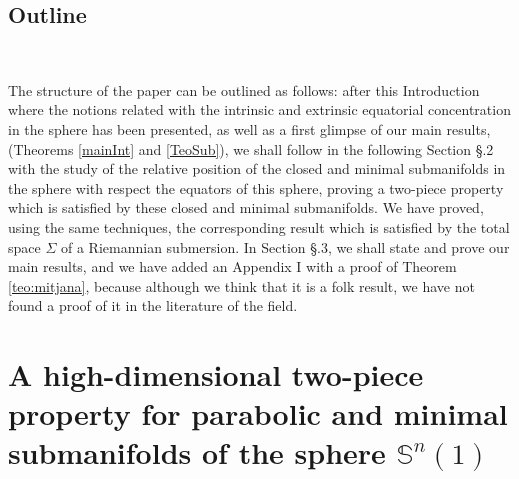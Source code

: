 \documentclass[11pt,letterpaper]{amsart}
\theoremstyle{definition}
\theoremstyle{remark}
\begin{document}
\subsection{Outline}\

The structure of the paper can be outlined as follows: after this Introduction where the notions related with the intrinsic and extrinsic equatorial concentration in the sphere has been presented, as well as a first glimpse of our main results, (Theorems \ref{mainInt} and \ref{TeoSub}), we shall follow in the following Section \S.2 with the study of the relative position of the closed and minimal submanifolds in the sphere with respect the equators of this sphere, proving a two-piece property which is satisfied by these closed and minimal submanifolds. We have proved, using the same techniques, the corresponding result which is satisfied by the total space $\Sigma$ of a Riemannian submersion. In Section \S.3, we shall state and prove our main results, and we have added an Appendix I with a proof of Theorem \ref{teo:mitjana}, because although we think that it is a folk result, we have not found a proof of it in the literature of the field.





\section{A high-dimensional two-piece property for parabolic and minimal submanifolds of the sphere $\mathbb{S}^n(1)$ }\

\end{document}
